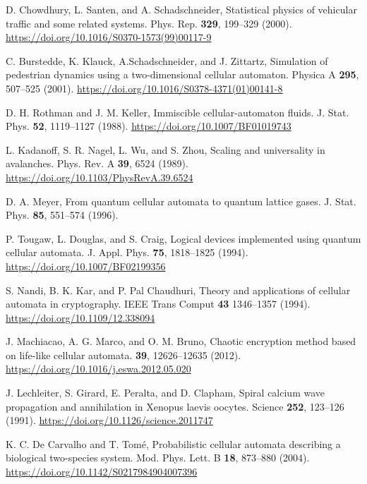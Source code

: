\begin{thebibliography}{04}

\raggedright
D. Chowdhury, L. Santen, and A. Schadschneider,
Statistical physics of vehicular traffic and some related systems.
Phys. Rep. \textbf{329}, 199--329 (2000).
\url{https://doi.org/10.1016/S0370-1573(99)00117-9}


\raggedright
C. Burstedde, K. Klauck, A.Schadschneider, and J. Zittartz,
Simulation of pedestrian dynamics using a two-dimensional cellular automaton. 
Physica A \textbf{295}, 507--525 (2001).
\url{https://doi.org/10.1016/S0378-4371(01)00141-8}

\raggedright
D. H. Rothman and J. M. Keller,
Immiscible cellular-automaton fluids.
J. Stat. Phys. \textbf{52}, 1119--1127 (1988). 
\url{https://doi.org/10.1007/BF01019743}

\raggedright
L. Kadanoff, S. R. Nagel, L. Wu, and S. Zhou,
Scaling and universality in avalanches.
Phys. Rev. A \textbf{39}, 6524 (1989).
\url{https://doi.org/10.1103/PhysRevA.39.6524}

\raggedright
D. A. Meyer,
From quantum cellular automata to quantum lattice gases.
J. Stat. Phys. \textbf{85}, 551--574 (1996).
\url{}

\raggedright
P. Tougaw, L. Douglas, and S. Craig,
Logical devices implemented using quantum cellular automata.
J. Appl. Phys. \textbf{75}, 1818--1825 (1994).
\url{https://doi.org/10.1007/BF02199356}

\raggedright
S. Nandi, B. K. Kar, and P. Pal Chaudhuri,
Theory and applications of cellular automata in cryptography.
IEEE Trans Comput \textbf{43} 1346--1357 (1994).
\url{https://doi.org/10.1109/12.338094}

\raggedright
J. Machiacao, A. G. Marco, and O. M. Bruno,
Chaotic encryption method based on life-like cellular automata.
\textbf{39}, 12626--12635 (2012).
\url{https://doi.org/10.1016/j.eswa.2012.05.020}

\raggedright
J. Lechleiter, S. Girard, E. Peralta, and D. Clapham,
Spiral calcium wave propagation and annihilation in Xenopus laevis oocytes.
Science \textbf{252}, 123--126 (1991).
\url{https://doi.org/10.1126/science.2011747}

\raggedright
K. C. De Carvalho and T. Tomé,
Probabilistic cellular automata describing a biological two-species system.
Mod. Phys. Lett. B \textbf{18}, 873--880 (2004).
\url{https://doi.org/10.1142/S0217984904007396}


\end{thebibliography}
